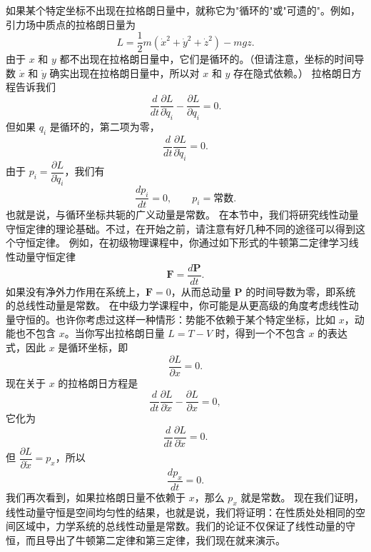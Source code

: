 如果某个特定坐标不出现在拉格朗日量中，就称它为"循环的"或"可遗的"。例如，引力场中质点的拉格朗日量为
\[
L = \frac{1}{2}m(\dot{x}^2 + \dot{y}^2 + \dot{z}^2) - mgz.
\]
由于 $x$ 和 $y$ 都不出现在拉格朗日量中，它们是循环的。（但请注意，坐标的时间导数 $\dot{x}$ 和 $\dot{y}$ 确实出现在拉格朗日量中，所以对 $x$ 和 $y$ 存在隐式依赖。）
拉格朗日方程告诉我们
\[
\frac{d}{dt}\frac{\partial L}{\partial \dot{q}_i} - \frac{\partial L}{\partial q_i} = 0.
\]
但如果 $q_i$ 是循环的，第二项为零，
\[
\frac{d}{dt}\frac{\partial L}{\partial \dot{q}_i} = 0.
\]
由于 $p_i = \dfrac{\partial L}{\partial \dot{q}_i}$，我们有
\[
\frac{dp_i}{dt} = 0, \qquad p_i = \text{常数}.
\]
也就是说，与循环坐标共轭的广义动量是常数。
在本节中，我们将研究线性动量守恒定律的理论基础。不过，在开始之前，请注意有好几种不同的途径可以得到这个守恒定律。
例如，在初级物理课程中，你通过如下形式的牛顿第二定律学习线性动量守恒定律
\[
\mathbf{F} = \frac{d\mathbf{P}}{dt}.
\]
如果没有净外力作用在系统上，$\mathbf{F} = 0$，从而总动量 $\mathbf{P}$ 的时间导数为零，即系统的总线性动量是常数。
在中级力学课程中，你可能是从更高级的角度考虑线性动量守恒的。也许你考虑过这样一种情形：势能不依赖于某个特定坐标，比如 $x$，动能也不包含 $x$。当你写出拉格朗日量 $L = T - V$ 时，得到一个不包含 $x$ 的表达式，因此 $x$ 是循环坐标，即
\[
\frac{\partial L}{\partial x} = 0.
\]
现在关于 $x$ 的拉格朗日方程是
\[
\frac{d}{dt}\frac{\partial L}{\partial \dot{x}} - \frac{\partial L}{\partial x} = 0,
\]
它化为
\[
\frac{d}{dt}\frac{\partial L}{\partial \dot{x}} = 0.
\]
但 $\dfrac{\partial L}{\partial \dot{x}} = p_x$，所以
\[
\frac{dp_x}{dt} = 0.
\]
我们再次看到，如果拉格朗日量不依赖于 $x$，那么 $p_x$ 就是常数。
现在我们证明，线性动量守恒是空间均匀性的结果，也就是说，我们将证明：在性质处处相同的空间区域中，力学系统的总线性动量是常数。我们的论证不仅保证了线性动量的守恒，而且导出了牛顿第二定律和第三定律，我们现在就来演示。
